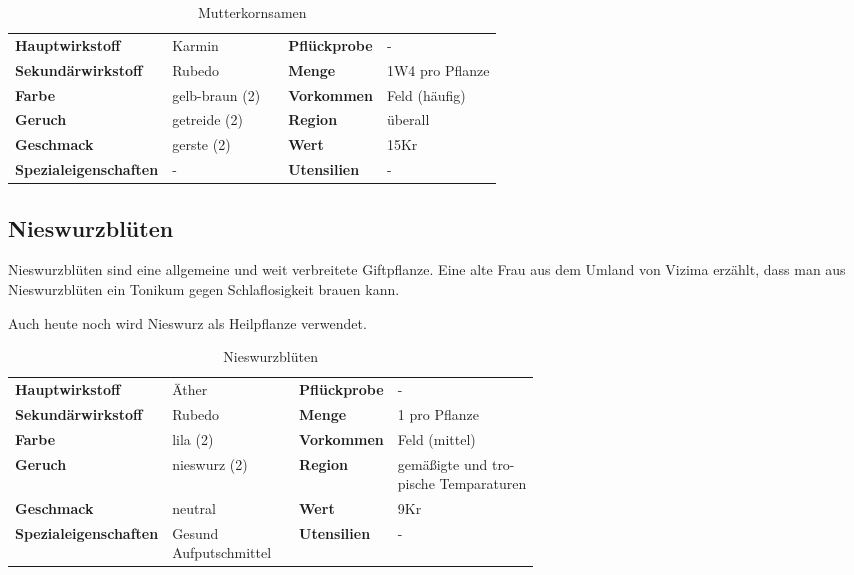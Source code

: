 \begin{table}[h] 
\begin{center} 
\begin{tabular}{|l|l|p{1cm}|l|l|} 
  	\cline{1-2} \cline{4-5} 
  	\textbf{Hauptwirkstoff} & Karmin && \textbf{Pflückprobe} & - \\ \cline{1-2} \cline{4-5} 
  	\textbf{Sekundärwirkstoff} & Rubedo && \textbf{Menge} & 1W4 pro Pflanze \\ \cline{1-2} \cline{4-5} 
  	\textbf{Farbe} & gelb-braun (2) && \textbf{Vorkommen} & Feld (häufig) \\ \cline{1-2} \cline{4-5} 
  	\textbf{Geruch} & getreide (2) && \textbf{Region} & überall \\ \cline{1-2} \cline{4-5} 
  	\textbf{Geschmack} & gerste (2) && \textbf{Wert} & 15Kr \\ \cline{1-2} \cline{4-5} 
  	\textbf{Spezialeigenschaften} & - && \textbf{Utensilien} & - \\ \cline{1-2} \cline{4-5} 
\end{tabular} 
\end{center} 
\caption{Mutterkornsamen} 
\label{tab:mutterkornsamen} 
\end{table}

\subsection{Nieswurzblüten}
Nieswurzblüten sind eine allgemeine und weit verbreitete Giftpflanze. Eine alte Frau aus dem Umland von Vizima erzählt, dass man aus Nieswurzblüten ein Tonikum gegen Schlaflosigkeit brauen kann.

Auch heute noch wird Nieswurz als Heilpflanze verwendet. 

\begin{table}[h] 
\begin{center} 
\begin{tabular}{|l|l|p{1cm}|l|l|} 
  	\cline{1-2} \cline{4-5} 
  	\textbf{Hauptwirkstoff} & Äther && \textbf{Pflückprobe} & - \\ \cline{1-2} \cline{4-5} 
  	\textbf{Sekundärwirkstoff} & Rubedo && \textbf{Menge} & 1 pro Pflanze \\ \cline{1-2} \cline{4-5} 
  	\textbf{Farbe} & lila (2) && \textbf{Vorkommen} & Feld (mittel) \\ \cline{1-2} \cline{4-5} 
  	\textbf{Geruch} & nieswurz (2) && \textbf{Region} & \brcell{gemäßigte und tro- \\ pische Temparaturen} \\ \cline{1-2} \cline{4-5} 
  	\textbf{Geschmack} & neutral && \textbf{Wert} & 9Kr \\ \cline{1-2} \cline{4-5} 
  	\textbf{Spezialeigenschaften} & \brcell{Gesund \\ Aufputschmittel} && \textbf{Utensilien} & - \\ \cline{1-2} \cline{4-5} 
\end{tabular} 
\end{center} 
\caption{Nieswurzblüten} 
\label{tab:nieswurzblueten} 
\end{table}


